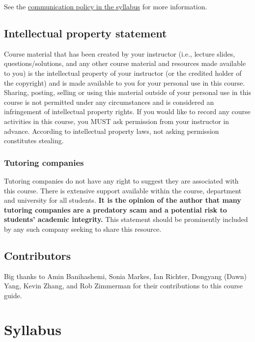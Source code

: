 \documentclass[
  openany]{book}
\begin{document}
See the \protect\hyperlink{communication-policy}{communication policy in the syllabus} for more information.

\hypertarget{intellectual-property-statement}{%
\section{Intellectual property statement}\label{intellectual-property-statement}}

Course material that has been created by your instructor (i.e., lecture slides, questions/solutions, and any other course material and resources made available to you) is the intellectual property of your instructor (or the credited holder of the copyright) and is made available to you for your personal use in this course. Sharing, posting, selling or using this material outside of your personal use in this course is not permitted under any circumstances and is considered an infringement of intellectual property rights. If you would like to record any course activities in this course, you MUST ask permission from your instructor in advance. According to intellectual property laws, not asking permission constitutes stealing.

\hypertarget{tutoring-companies}{%
\subsection{Tutoring companies}\label{tutoring-companies}}

Tutoring companies do not have any right to suggest they are associated with this course. There is extensive support available within the course, department and university for all students. \textbf{It is the opinion of the author that many tutoring companies are a predatory scam and a potential risk to students' academic integrity.} This statement should be prominently included by any such company seeking to share this resource.

\hypertarget{contributors}{%
\section{Contributors}\label{contributors}}

Big thanks to Amin Banihashemi, Sonia Markes, Ian Richter, Dongyang (Dawn) Yang, Kevin Zhang, and Rob Zimmerman for their contributions to this course guide.

\hypertarget{syllabus}{%
\chapter{Syllabus}\label{syllabus}}
\end{document}
